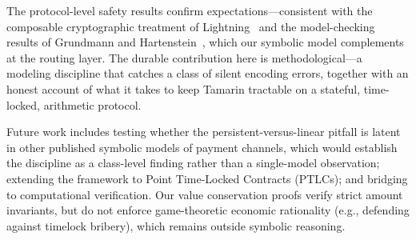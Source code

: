 \documentclass[sigconf,review]{acmart}
\theoremstyle{acmdefinition}
\begin{document}
The protocol-level safety results confirm expectations---consistent with the composable cryptographic treatment of Lightning~\cite{kiayias2020composable} and the model-checking results of Grundmann and Hartenstein~\cite{grundmann2025model}, which our symbolic model complements at the routing layer. The durable contribution here is methodological---a modeling discipline that catches a class of silent encoding errors, together with an honest account of what it takes to keep Tamarin tractable on a stateful, time-locked, arithmetic protocol.

Future work includes testing whether the persistent-versus-linear pitfall is latent in other published symbolic models of payment channels, which would establish the discipline as a class-level finding rather than a single-model observation; extending the framework to Point Time-Locked Contracts (PTLCs); and bridging to computational verification. Our value conservation proofs verify strict amount invariants, but do not enforce game-theoretic economic rationality (e.g., defending against timelock bribery), which remains outside symbolic reasoning.
\end{document}
